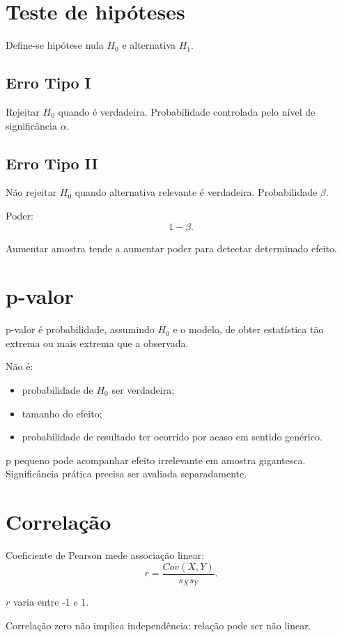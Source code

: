 \section{Teste de hipóteses}

Define-se hipótese nula $H_0$ e alternativa $H_1$.

\subsection{Erro Tipo I}

Rejeitar $H_0$ quando é verdadeira. Probabilidade controlada pelo nível de significância $\alpha$.

\subsection{Erro Tipo II}

Não rejeitar $H_0$ quando alternativa relevante é verdadeira. Probabilidade $\beta$.

Poder:
\[
1-\beta.
\]

Aumentar amostra tende a aumentar poder para detectar determinado efeito.

\section{p-valor}

p-valor é probabilidade, assumindo $H_0$ e o modelo, de obter estatística tão extrema ou mais extrema que a observada.

Não é:
\begin{itemize}
\item probabilidade de $H_0$ ser verdadeira;
\item tamanho do efeito;
\item probabilidade de resultado ter ocorrido por acaso em sentido genérico.
\end{itemize}

p pequeno pode acompanhar efeito irrelevante em amostra gigantesca. Significância prática precisa ser avaliada separadamente.

\section{Correlação}

Coeficiente de Pearson mede associação linear:
\[
r=\frac{Cov(X,Y)}{s_Xs_Y}.
\]

$r$ varia entre -1 e 1.

Correlação zero não implica independência: relação pode ser não linear.

